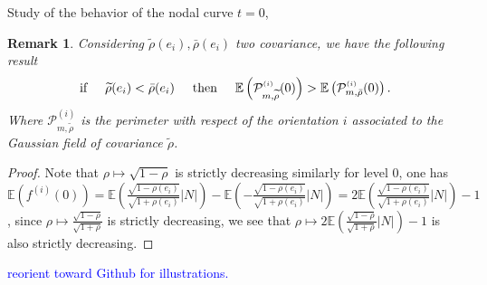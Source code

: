 \documentclass[12pt]{article}
\renewcommand{\tilde}{\widetilde}
\theoremstyle{Theorem}
\newtheorem{remark}{Remark}
\begin{document}
Study of the behavior of the nodal curve $t = 0$, 
\begin{remark}
\label{decreasingrho}
Considering $\tilde{\rho}(e_i), \bar{\rho}(e_i)$ two covariance, we  have the following result 
\begin{equation*}
 \text{if} \hspace{0.5cm} \tilde{\rho}(e_i) < \bar{\rho}(e_i) \hspace{0.5cm} \text{then} \hspace{0.5cm}\mathbb{E}\left(\mathcal{P}^{\scriptscriptstyle (i)}_{m, \tilde{\rho}}(0)\right) > \mathbb{E}\left(\mathcal{P}^{\scriptscriptstyle (i)}_{m, \bar{\rho}}(0)\right).
\end{equation*}
Where $\mathcal{P}^{\scriptscriptstyle (i)}_{m, \tilde{\rho}}$ is the perimeter with respect of the orientation $i$ associated to the Gaussian field of covariance $\tilde{\rho}$. 
\end{remark}
\begin{proof}
Note that $\rho \mapsto \sqrt{1-\rho}$ is strictly decreasing similarly  for level $0$, one has $\mathbb{E}\left(f^{(i)}(0)\right) = \mathbb{E}\left(\frac{\sqrt{1-\rho(e_i)}}{\sqrt{1+\rho(e_i)}}|N|\right) - \mathbb{E}\left(-\frac{\sqrt{1-\rho(e_i)}}{\sqrt{1+\rho(e_i)}}|N|\right) = 2\mathbb{E}\left(\frac{\sqrt{1-\rho(e_i)}}{\sqrt{1+\rho(e_i)}}|N|\right) - 1$, since $\rho \mapsto \frac{\sqrt{1-\rho}}{\sqrt{1+\rho}}$ is strictly decreasing, we see that $\rho \mapsto 2\mathbb{E}\left(\frac{\sqrt{1-\rho}}{\sqrt{1+\rho}}|N|\right) - 1 $ is also strictly decreasing. 
\end{proof}
\textcolor{blue}{reorient toward Github for illustrations.}
\end{document}
